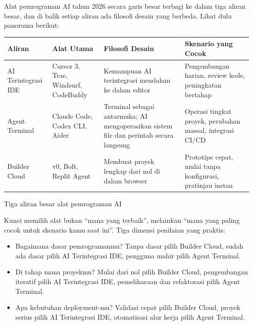 


Alat pemrograman AI tahun 2026 secara garis besar terbagi ke dalam tiga aliran besar, dan di balik setiap aliran ada filosofi desain yang berbeda. Lihat dulu panorama berikut:

\begin{center}
\begin{tabularx}{\linewidth}{|X|X|X|X|}
\hline
\textbf{Aliran} & \textbf{Alat Utama} & \textbf{Filosofi Desain} & \textbf{Skenario yang Cocok} \tabularnewline
\hline
AI Terintegrasi IDE & Cursor 3, Trae, Windsurf, CodeBuddy & Kemampuan AI terintegrasi mendalam ke dalam editor & Pengembangan harian, review kode, peningkatan bertahap \tabularnewline
Agent Terminal & Claude Code, Codex CLI, Aider & Terminal sebagai antarmuka; AI mengoperasikan sistem file dan perintah secara langsung & Operasi tingkat proyek, perubahan massal, integrasi CI/CD \tabularnewline
Builder Cloud & v0, Bolt, Replit Agent & Membuat proyek lengkap dari nol di dalam browser & Prototipe cepat, mulai tanpa konfigurasi, pratinjau instan \tabularnewline
\hline
\end{tabularx}
\end{center}

\begin{center}\small\color{gray}Tiga aliran besar alat pemrograman AI\end{center}

Kunci memilih alat bukan “mana yang terbaik”, melainkan “mana yang paling cocok untuk skenario kamu saat ini”. Tiga dimensi penilaian yang praktis:

\begin{itemize}
  \item Bagaimana dasar pemrogramanmu? Tanpa dasar pilih Builder Cloud, sudah ada dasar pilih AI Terintegrasi IDE, pengguna mahir pilih Agent Terminal.
  \item Di tahap mana proyekmu? Mulai dari nol pilih Builder Cloud, pengembangan iteratif pilih AI Terintegrasi IDE, pemeliharaan dan refaktorasi pilih Agent Terminal.
  \item Apa kebutuhan deployment-mu? Validasi cepat pilih Builder Cloud, proyek serius pilih AI Terintegrasi IDE, otomatisasi alur kerja pilih Agent Terminal.
\end{itemize}

